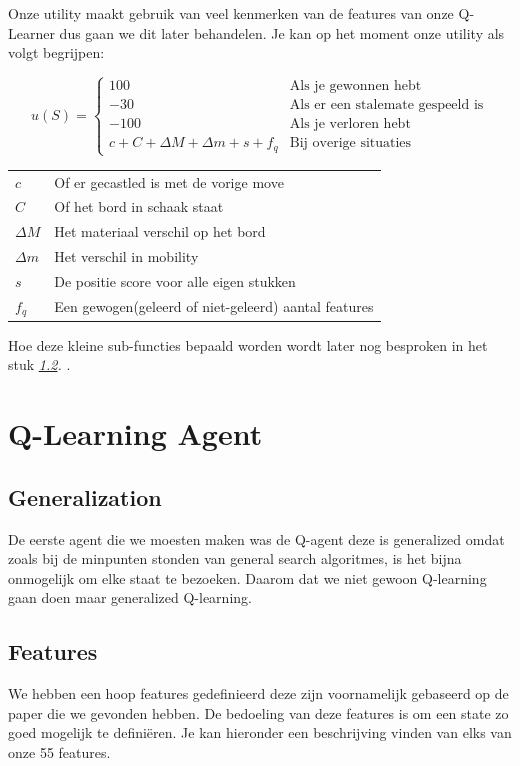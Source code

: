 \documentclass[a4paper,openany]{uantwerpenassignment}
\makeatletter
\newenvironment{conditions}
  {\par\vspace{\abovedisplayskip}\noindent\begin{tabular}{>{$}l<{$} @{${}={}$} l}}
  {\end{tabular}\par\vspace{\belowdisplayskip}}
\newcommand{\reference}[1]{\textit{\ref{#1}. \nameref{#1}}}
\makeatother
\begin{document}
Onze utility maakt gebruik van veel kenmerken van de features van onze Q-Learner dus gaan we dit later behandelen.
Je kan op het moment onze utility als volgt begrijpen:

$$
u(S) = 
\begin{cases}
    100 &\mbox{Als je gewonnen hebt}\\
    -30 &\mbox{Als er een stalemate gespeeld is}\\
    -100 &\mbox{Als je verloren hebt}\\
    c + C + \Delta M + \Delta m + s + f_q &\mbox{Bij overige situaties}
\end{cases}
$$

\begin{conditions}
    c & Of er gecastled is met de vorige move\\
    C & Of het bord in schaak staat\\
    \Delta M & Het materiaal verschil op het bord\\
    \Delta m & Het verschil in mobility\\
    s & De positie score voor alle eigen stukken\\
    f_q & Een gewogen(geleerd of niet-geleerd) aantal features
\end{conditions}

Hoe deze kleine sub-functies bepaald worden wordt later nog besproken in het stuk \reference{features}.

\chapter{Q-Learning Agent}

\section{Generalization}

De eerste agent die we moesten maken was de Q-agent deze is generalized omdat zoals bij de minpunten stonden van general search algoritmes, is het bijna onmogelijk om elke staat te bezoeken. Daarom dat we niet gewoon Q-learning gaan doen maar generalized Q-learning.

\section{Features}
\label{features}

We hebben een hoop features gedefinieerd deze zijn voornamelijk gebaseerd op de paper\cite{rl} die we gevonden hebben. De bedoeling van deze features is om een state zo goed mogelijk te definiëren. Je kan hieronder een beschrijving vinden van elks van onze 55 features.
\end{document}

